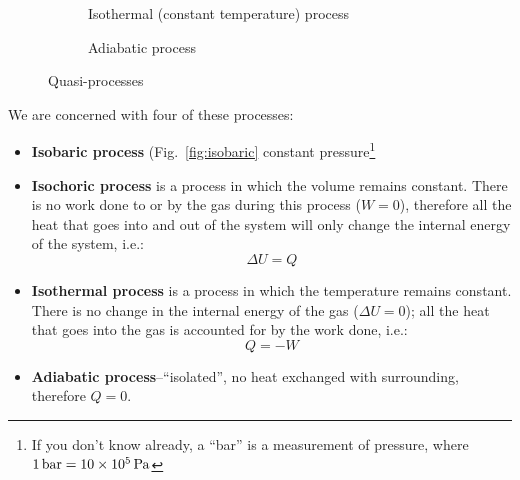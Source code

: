 \begin{figure}[ht]
  \begin{subfigure}{.4\textwidth}
    \centering
    \caption{Isothermal (constant temperature) process}
    \label{fig:isothermal}
  \end{subfigure}
  \begin{subfigure}{.4\textwidth}
    \centering
    \caption{Adiabatic process}
    \label{fig:adiabatic}
  \end{subfigure}
  \caption{Quasi-processes}
\end{figure}
We are concerned with four of these processes:
\begin{itemize}[itemsep=6pt]
\item\textbf{Isobaric process} (Fig.~\ref{fig:isobaric}
  constant pressure\footnote{If you don't know
  already, a ``bar'' is a measurement of pressure, where
  $\SI1{bar}=\SI{10e5}{\pascal}$}
\item\textbf{Isochoric process} is a process in which the volume remains
  constant. There is no work done to or by the gas during this process
  ($W=0$), therefore all the heat that goes into and out of the system will
  only change the internal energy of the system, i.e.:
  \begin{equation*}
    \Delta U = Q
  \end{equation*}
\item\textbf{Isothermal process} is a process in which the temperature remains
  constant. There is no change in the internal energy of the gas
  ($\Delta U=0$); all the heat that goes into the gas is accounted for by the
  work done, i.e.:
  \begin{equation*}
    Q=-W
  \end{equation*}
\item\textbf{Adiabatic process}--``isolated'', no heat exchanged with
  surrounding, therefore $Q=0$.
\end{itemize}



